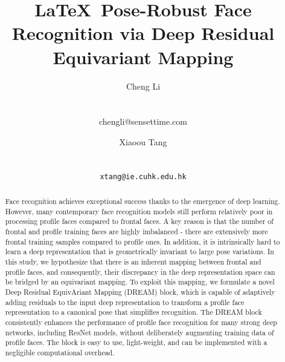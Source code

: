 \documentclass{article}
\begin{document}
\title{\LaTeX\ Pose-Robust Face Recognition via Deep Residual Equivariant Mapping}
\author{ Cheng Li\\
\\
\\
{chengli@sensettime.com}
\and
Xiaoou Tang\\
\\
\\
{\tt\small xtang@ie.cuhk.edu.hk}
}

\maketitle
\begin{abstract}
Face recognition achieves exceptional success thanks to the emergence of deep learning. However, many contemporary face recognition models still perform relatively poor in processing profile faces compared to frontal faces. A key reason is that the number of frontal and profile training faces are highly imbalanced - there are extensively more frontal training samples compared to profile ones. In addition, it is intrinsically hard to learn a deep representation that is geometrically invariant to large pose variations. In this study, we hypothesize that there is an inherent mapping between frontal and profile faces, and consequently, their discrepancy in the deep representation space can be bridged by an equivariant mapping. To exploit this mapping, we formulate a novel Deep Residual EquivAriant Mapping (DREAM) block, which is capable of adaptively adding residuals to the input deep representation to transform a profile face representation to a canonical pose that simplifies recognition. The DREAM block consistently enhances the performance of profile face recognition for many strong deep networks, including ResNet models, without deliberately augmenting training data of profile faces. The block is easy to use, light-weight, and can be implemented with a negligible computational overhead.
\end{abstract}
\end{document}
